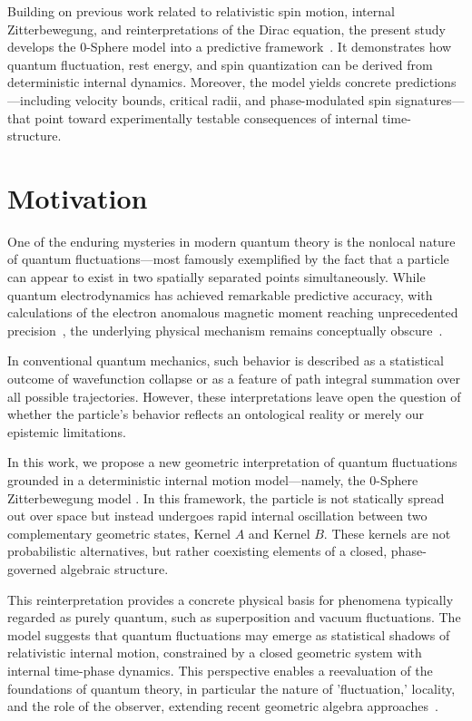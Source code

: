 \documentclass[%
 reprint,
 amsmath,amssymb,
 aps,
]{revtex4-1}
\numberwithin{equation}{section}%
\begin{document}
Building on previous work related to relativistic spin motion, internal Zitterbewegung, and reinterpretations of the Dirac equation, the present study develops the 0-Sphere model into a predictive framework~\cite{barut1981}. It demonstrates how quantum fluctuation, rest energy, and spin quantization can be derived from deterministic internal dynamics. Moreover, the model yields concrete predictions—including velocity bounds, critical radii, and phase-modulated spin signatures—that point toward experimentally testable consequences of internal time-structure.


\section{Motivation}

One of the enduring mysteries in modern quantum theory is the nonlocal nature of quantum fluctuations—most famously exemplified by the fact that a particle can appear to exist in two spatially separated points simultaneously. While quantum electrodynamics has achieved remarkable predictive accuracy, with calculations of the electron anomalous magnetic moment reaching unprecedented precision~\cite{aoyama2015}, the underlying physical mechanism remains conceptually obscure~\cite{ballentine1998}.

In conventional quantum mechanics, such behavior is described as a statistical outcome of wavefunction collapse or as a feature of path integral summation over all possible trajectories. However, these interpretations leave open the question of whether the particle's behavior reflects an ontological reality or merely our epistemic limitations.

In this work, we propose a new geometric interpretation of quantum fluctuations grounded in a deterministic internal motion model—namely, the 0-Sphere Zitterbewegung model \cite{schrodinger1930}. In this framework, the particle is not statically spread out over space but instead undergoes rapid internal oscillation between two complementary geometric states, Kernel $A$ and Kernel $B$. These kernels are not probabilistic alternatives, but rather coexisting elements of a closed, phase-governed algebraic structure.

This reinterpretation provides a concrete physical basis for phenomena typically regarded as purely quantum, such as superposition and vacuum fluctuations. The model suggests that quantum fluctuations may emerge as statistical shadows of relativistic internal motion, constrained by a closed geometric system with internal time-phase dynamics. This perspective enables a reevaluation of the foundations of quantum theory, in particular the nature of 'fluctuation,' locality, and the role of the observer, extending recent geometric algebra approaches~\cite{hestenes2010}.
\end{document}
